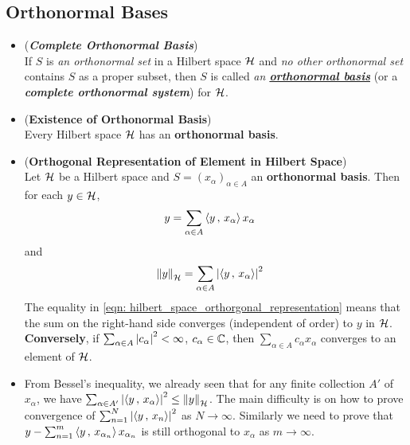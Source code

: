 \documentclass[11pt]{article}
\begin{document}
\subsection{Orthonormal Bases}
\begin{itemize}
\item \begin{definition} (\emph{\textbf{Complete Orthonormal Basis}})\\
If $S$ is \emph{an orthonormal set} in a Hilbert space ${\mathcal H}$ and \emph{no other orthonormal set} contains $S$ as a proper subset, then $S$ is called \emph{an \underline{\textbf{orthonormal basis}}} (or a \emph{\textbf{complete orthonormal system}}) for ${\mathcal H}$.
\end{definition}

\item \begin{theorem} (\textbf{Existence of Orthonormal Basis})\\
Every Hilbert space ${\mathcal H}$ has an \textbf{orthonormal basis}.
\end{theorem}

\item \begin{proposition} (\textbf{Orthogonal Representation of Element in Hilbert Space})\\
Let ${\mathcal H}$ be a Hilbert space and $S = (x_{\alpha})_{\alpha \in A}$ an \textbf{orthonormal basis}. Then for each $y \in {\mathcal H}$,
\begin{align}
y &= \sum_{\alpha \in A}\left\langle y\,,\, x_{\alpha} \right\rangle x_{\alpha} \label{eqn: hilbert_space_orthorgonal_representation}
\end{align}
and
\begin{align}
\left\|y\right\|_{{\mathcal H}} &= \sum_{\alpha \in A}\left\lvert \left\langle y\,,\, x_{\alpha} \right\rangle \right\rvert^2 \label{eqn: hilbert_space_norm_representation}
\end{align}
The equality in \eqref{eqn: hilbert_space_orthorgonal_representation} means that the sum on the right-hand side converges (independent of order) to $y$ in ${\mathcal H}$. \textbf{Conversely}, if $\sum_{\alpha \in A}\left\lvert c_{\alpha} \right\rvert^2 < \infty$,  $c_{\alpha} \in {\mathbb C}$, then
$\sum_{\alpha \in A}c_{\alpha} x_{\alpha}$ converges to an element of ${\mathcal H}$.
\end{proposition}

\item \begin{remark}
From Bessel's inequality, we already seen that for any finite collection $A'$ of $x_{\alpha}$, we have $\sum_{\alpha \in A'}\left\lvert \left\langle y\,,\, x_{\alpha} \right\rangle \right\rvert^2 \le \left\|y\right\|_{{\mathcal H}}$. The main difficulty is on how to prove convergence of $\sum_{n=1}^{N}\left\lvert \left\langle y\,,\, x_{n} \right\rangle \right\rvert^2 $ as $N\rightarrow \infty$. Similarly we need to prove that $y-  \sum_{n=1}^{m}\left\langle y\,,\, x_{\alpha_n} \right\rangle x_{\alpha_n}$ is still orthogonal to $x_{\alpha}$ as $m \rightarrow \infty$. 
\end{remark}


\end{itemize}
\end{document}
